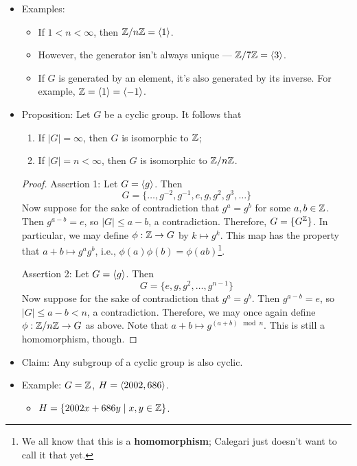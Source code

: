 \documentclass[../notes.tex]{subfiles}
\begin{document}
\begin{itemize}
    \item Examples:
    \begin{itemize}
        \item If $1<n<\infty$, then $\mathbb{Z}/n\mathbb{Z}=\left\langle{1}\right\rangle$.
        \item However, the generator isn't always unique --- $\mathbb{Z}/7\mathbb{Z}=\left\langle{3}\right\rangle$.
        \item If $G$ is generated by an element, it's also generated by its inverse. For example, $\mathbb{Z}=\left\langle{1}\right\rangle=\left\langle{-1}\right\rangle$.
    \end{itemize}
    \item Proposition: Let $G$ be a cyclic group. It follows that
    \begin{enumerate}
        \item If $|G|=\infty$, then $G$ is isomorphic to $\mathbb{Z}$;
        \item If $|G|=n<\infty$, then $G$ is isomorphic to $\mathbb{Z}/n\mathbb{Z}$.
    \end{enumerate}
    \begin{proof}
        Assertion 1: Let $G=\left\langle{g}\right\rangle$. Then
        \begin{equation*}
            G = \{\dots,g^{-2},g^{-1},e,g,g^2,g^3,\dots\}
        \end{equation*}
        Now suppose for the sake of contradiction that $g^a=g^b$ for some $a,b\in\mathbb{Z}$. Then $g^{a-b}=e$, so $|G|\leq a-b$, a contradiction. Therefore, $G=\{G^{\mathbb{Z}}\}$. In particular, we may define $\phi:\mathbb{Z}\to G$ by $k\mapsto g^k$. This map has the property that $a+b\mapsto g^ag^b$, i.e., $\phi(a)\phi(b)=\phi(ab)$\footnote{We all know that this is a \textbf{homomorphism}; Calegari just doesn't want to call it that yet.}.\par
        Assertion 2: Let $G=\left\langle{g}\right\rangle$. Then
        \begin{equation*}
            G = \{e,g,g^2,\dots,g^{n-1}\}
        \end{equation*}
        Now suppose for the sake of contradiction that $g^a=g^b$. Then $g^{a-b}=e$, so $|G|\leq a-b<n$, a contradiction. Therefore, we may once again define $\phi:\mathbb{Z}/n\mathbb{Z}\to G$ as above. Note that $a+b\mapsto g^{(a+b)\mod n}$. This is still a homomorphism, though.
    \end{proof}
    \item Claim: Any subgroup of a cyclic group is also cyclic.
    \item Example: $G=\mathbb{Z}$, $H=\left\langle{2002,686}\right\rangle$.
    \begin{itemize}
        \item $H=\{2002x+686y\mid x,y\in\mathbb{Z}\}$.

\end{itemize}
\end{itemize}
\end{document}
